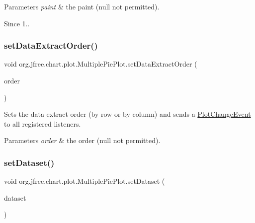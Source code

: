 \begin{DoxyParams}{Parameters}
{\em paint} & the paint ({\ttfamily null} not permitted).\\
\hline
\end{DoxyParams}
\begin{DoxySince}{Since}
1.. 
\end{DoxySince}
\mbox{\label{classorg_1_1jfree_1_1chart_1_1plot_1_1_multiple_pie_plot_aea81ac70a3b4f07b90793819828fa9a9}} 
\subsubsection{\texorpdfstring{set\+Data\+Extract\+Order()}{setDataExtractOrder()}}
{\footnotesize\ttfamily void org.\+jfree.\+chart.\+plot.\+Multiple\+Pie\+Plot.\+set\+Data\+Extract\+Order (\begin{DoxyParamCaption}\item[{Table\+Order}]{order }\end{DoxyParamCaption})}

Sets the data extract order (by row or by column) and sends a \mbox{\hyperlink{}{Plot\+Change\+Event}} to all registered listeners.


\begin{DoxyParams}{Parameters}
{\em order} & the order ({\ttfamily null} not permitted). \\
\hline
\end{DoxyParams}
\mbox{\label{classorg_1_1jfree_1_1chart_1_1plot_1_1_multiple_pie_plot_a9a348ffb3a2685730c91b4411192d0a2}} 
\subsubsection{\texorpdfstring{set\+Dataset()}{setDataset()}}
{\footnotesize\ttfamily void org.\+jfree.\+chart.\+plot.\+Multiple\+Pie\+Plot.\+set\+Dataset (\begin{DoxyParamCaption}\item[{\mbox{\hyperlink{interfaceorg_1_1jfree_1_1data_1_1category_1_1_category_dataset}{Category\+Dataset}}}]{dataset }\end{DoxyParamCaption})}


